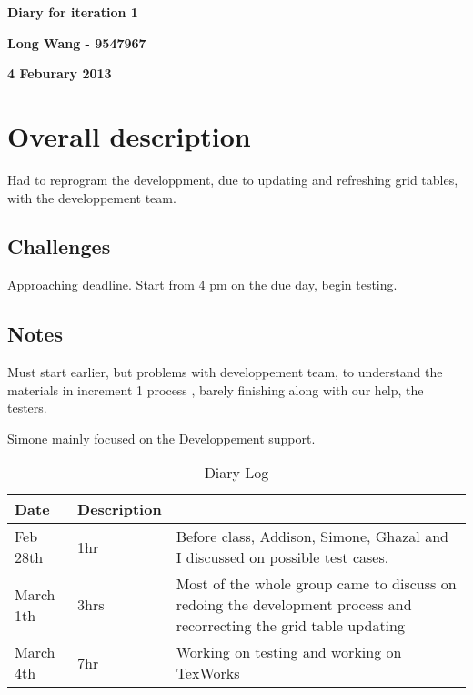 \documentclass[12pt]{article}
\begin{document}
\vspace*{0.5in}
\centerline{\bf\Large Diary for iteration 1}

\vspace*{0.5in}
\centerline{\bf\Large Long Wang - 9547967}

\vspace*{0.5in}
\centerline{\bf\Large 4 Feburary 2013}

\clearpage

\section{Overall description}
Had to reprogram the developpment, due to updating and refreshing grid tables, with the developpement team.
\subsection{Challenges}
Approaching deadline.  Start from 4 pm on the due day, begin testing.
\subsection{Notes}
Must start earlier, but problems with developpement team, to understand the materials in increment 1 process , barely finishing along with our help, the testers.

Simone mainly focused on the Developpement support.
\begin{table}[htbp]
\caption{Diary Log}
\begin{tabular}{|l|l | p{12cm}|}
\hline
Date & Description \\\hline\hline
Feb 28th & 1hr & Before class, Addison, Simone, Ghazal and I discussed on possible test cases. \\\hline\hline
March 1th& 3hrs & Most of the whole group came to discuss on redoing the development process and recorrecting the grid table updating \\\hline\hline
March 4th& 7hr & Working on testing and working on TexWorks \\\hline\hline


\end{tabular}
\end{table}
\end{document}
